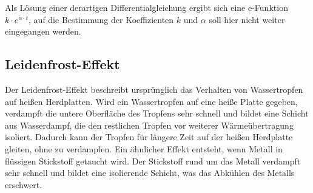 Als Lösung einer derartigen Differentialgleichung ergibt sich eine e-Funktion $k \cdot e^{\alpha \cdot t}$, auf die Bestimmung der Koeffizienten $k$ und $\alpha$ soll hier nicht weiter eingegangen werden. 

\subsection{Leidenfrost-Effekt}
Der Leidenfrost-Effekt beschreibt ursprünglich das Verhalten von Wassertropfen auf heißen Herdplatten. Wird ein Wassertropfen auf eine heiße Platte gegeben, verdampft die untere Oberfläche des Tropfens sehr schnell und bildet eine Schicht aus Wasserdampf, die den restlichen Tropfen vor weiterer Wärmeübertragung isoliert. Dadurch kann der Tropfen für längere Zeit auf der heißen Herdplatte gleiten, ohne zu verdampfen.
Ein ähnlicher Effekt entsteht, wenn Metall in flüssigen Stickstoff getaucht wird. Der Stickstoff rund um das Metall verdampft sehr schnell und bildet eine isolierende Schicht, was das Abkühlen des Metalls erschwert.
